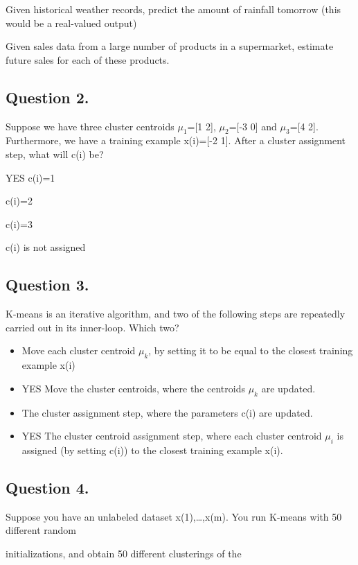 \documentclass[11pt]{article} %
\begin{document}
Given historical weather records, predict the amount of rainfall tomorrow (this would be a real-valued output)

Given sales data from a large number of products in a supermarket, estimate future sales for each of these products.
\subsection{ Question 2. }
Suppose we have three cluster centroids $\mu_1$=[1 2], $\mu_2$=[-3 0] and $\mu_3$=[4 2]. 
Furthermore, we have a training example x(i)=[-2 1]. After a cluster assignment step, what will c(i) be?

YES c(i)=1

c(i)=2

c(i)=3

c(i) is not assigned


\subsection{ Question 3. }
K-means is an iterative algorithm, and two of the following steps are repeatedly carried out in its inner-loop. Which two?

\begin{itemize}
	\item Move each cluster centroid $\mu_k$, by setting it to be equal to the closest training example x(i)
	
	\item YES Move the cluster centroids, where the centroids $\mu_k$ are updated.
	
	\item The cluster assignment step, where the parameters c(i) are updated.
	
	\item YES The cluster centroid assignment step, where each cluster centroid $\mu_i$ is assigned (by setting c(i)) to the closest training example x(i).
	\end{itemize}
\subsection{ Question 4. }
	Suppose you have an unlabeled dataset {x(1),…,x(m)}. You run K-means with 50 different random
	
	initializations, and obtain 50 different clusterings of the
	
\end{document}
